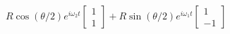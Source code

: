 \documentclass[preview]{standalone}
\begin{document}
\begin{center}
$R\cos(\theta/2) e^{i \omega_2 t}\begin{bmatrix} 1 \\ 1\end{bmatrix} + R \sin(\theta/2) e^{i \omega_1 t}\begin{bmatrix} 1 \\ -1\end{bmatrix}$
\end{center}
\end{document}
